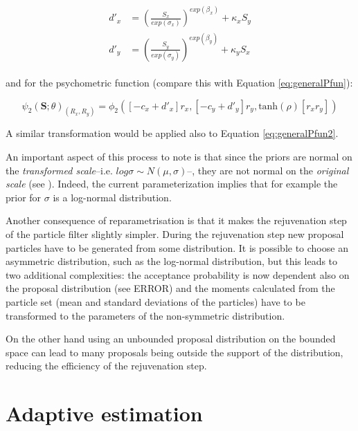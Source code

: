 \documentclass{article}\usepackage{knitr}
\begin{document}
\begin{align}
\begin{split}
d'_x &= (\frac{S_x}{exp(\sigma_x)})^{exp(\beta_x)} + \kappa_x S_y \\
d'_y &= (\frac{S_y}{exp(\sigma_y)})^{exp(\beta_y)} + \kappa_y S_x
\end{split}
\end{align}

and for the psychometric function (compare this with Equation \ref{eq:generalPfun}):

\begin{equation}
\psi_2(\bm{S}; \theta)_{(R_x, R_y)} = \phi_2([-c_x + d'_x]r_x, [-c_y + d'_y] r_y, \text{tanh}(\rho) [r_x r_y])
\end{equation}

A similar transformation would be applied also to Equation \ref{eq:generalPfun2}.

An important aspect of this process to note is that since the priors are normal on the \textit{transformed scale}--i.e. $log\sigma \sim N(\mu, \sigma)$--, they are not normal on the \textit{original scale} (see \citealt[pp. 729 - 732]{kruschke2015}). Indeed, the current parameterization implies that for  example the prior for $\sigma$ is a log-normal distribution.

Another consequence of reparametrisation is that it makes the rejuvenation step of the particle filter slightly simpler. During the rejuvenation step new proposal particles have to be generated from some distribution. It is possible to choose an asymmetric distribution, such as the log-normal distribution, but this leads to two additional complexities: the acceptance probability is now dependent also on the proposal distribution (see ERROR) and the moments calculated from the particle set (mean and standard deviations of the particles) have to be transformed to the parameters of the non-symmetric distribution. 

On the other hand using an unbounded proposal distribution on the bounded space can lead to many proposals  being  outside the support of the distribution, reducing the efficiency of the rejuvenation step.



\newpage


\section{Adaptive estimation}
\label{sec:adaptive}
\end{document}
